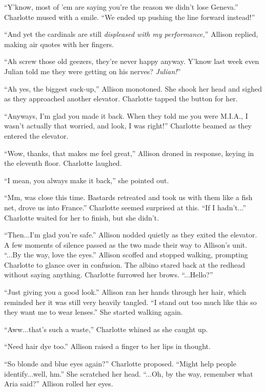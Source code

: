 \begin{Standard}
``Y'know, most of 'em are saying you're the reason we didn't lose Geneva.''
Charlotte mused with a smile. ``We ended up pushing the line forward instead!''

``And yet the cardinals are still \emph{displeased with my performance,}''
Allison replied, making air quotes with her fingers.

``Ah screw those old geezers, they're never happy anyway. Y'know last week even
Julian told me they were getting on his nerves? \emph{Julian!}''

``Ah yes, the biggest suck-up,'' Allison monotoned. She shook her head and sighed
as they approached another elevator. Charlotte tapped the button for her.

``Anyways, I'm glad you made it back. When they told me you were M.I.A., I wasn't
actually that worried, and look, I was right!'' Charlotte beamed as they entered the
elevator.

``Wow, thanks, that makes me feel great,'' Allison droned in response, keying in
the eleventh floor. Charlotte laughed.

``I mean, you always make it back,'' she pointed out.

``Mm, was close this time. Bastards retreated and took us with them like a fish net,
drove us into France.'' Charlotte seemed surprised at this. ``If I hadn't...''
Charlotte waited for her to finish, but she didn't.

``Then...I'm glad you're safe.'' Allison nodded quietly as they exited the elevator.
A few moments of silence passed as the two made their way to Allison's unit.
``...By the way, love the eyes.'' Allison scoffed and stopped walking, prompting
Charlotte to glance over in confusion. The albino stared back at the redhead
without saying anything. Charlotte furrowed her brows. ``...Hello?''

``Just giving you a good look.'' Allison ran her hands through her hair, which reminded
her it was still very heavily tangled. ``I stand out too much like this so they want
me to wear lenses.'' She started walking again.

``Aww...that's such a waste,'' Charlotte whined as she caught up.

``Need hair dye too.'' Allison raised a finger to her lips in thought.

``So blonde and blue eyes again?'' Charlotte proposed. ``Might help people
identify...well, hm.'' She scratched her head. ``...Oh, by the way, remember what
Aria said?'' Allison rolled her eyes.


\end{Standard}
